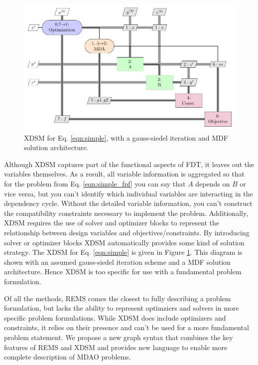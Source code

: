     \begin{figure}
        \begin{center}
        \includegraphics[height=.25\textheight]{XDSM/simple}
        \caption{XDSM for Eq. \ref{eqn:simple}, with a gauss-siedel iteration and MDF solution architecture. \label{fig:XDSM_simple}}
        \end{center}
    \end{figure}

    Although XDSM captures part of the functional aspects of FDT, it leaves out the variables themselves.  
    As a result, all variable information is aggregated 
    so that for the problem from Eq. \ref{eqn:simple_fpf} you can say that $A$ 
    depends on $B$ or vice versa, but you can't identify which 
    individual variables are interacting in the dependency cycle. 
    Without the detailed variable information, you can't construct the compatibility 
    constraints necessary to implement the problem. Additionally, XDSM 
    requires the use of solver and optimizer blocks to represent 
    the relationship between design variables and objectives/constraints. 
    By introducing solver or optimizer blocks XDSM automatically provides
    some kind of solution strategy. The XDSM for Eq. \ref{eqn:simple} is 
    given in Figure \ref{fig:XDSM_simple}. This diagram is shown with an 
    assumed gauss-siedel iteration scheme and a MDF solution architecture. 
    Hence XDSM is too specific for use with a fundamental problem formulation. 

    Of all the methods, REMS comes the closest to fully describing a problem formulation,
    but lacks the ability to represent optimziers and solvers in more specific problem 
    formulations. While XDSM does include optimizers and constraints, it relies on 
    their presence and can't be used for a more fundamental problem statement. 
    We propose a new graph syntax that combines the key features of REMS and XDSM
    and provides new language to enable more complete description of MDAO problems. 

